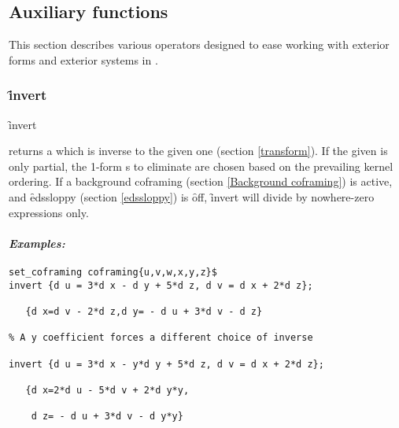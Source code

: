 
\subsection{Auxiliary functions}
\label{Auxiliary functions}

This section describes various operators designed to ease working with
exterior forms and exterior systems in \REDUCE.

\subsubsection{\f{invert}}
\label{invert}

\hypertarget{operator:EDS_INVERT}{}
\begin{syntax}
	\f{invert} 
\end{syntax}
returns a  which is inverse to the given one (section
\ref{transform}). If the  given is only partial, the
1-form s to eliminate are chosen based on the prevailing
kernel ordering. If a background coframing (section \ref{Background
coframing}) is active, and \f{edssloppy} (section \ref{edssloppy}) is
\f{off}, \f{invert} will divide by nowhere-zero expressions only.

\paragraph{\textit{Examples:}}
\begin{verbatim}
set_coframing coframing{u,v,w,x,y,z}$
invert {d u = 3*d x - d y + 5*d z, d v = d x + 2*d z};

   {d x=d v - 2*d z,d y= - d u + 3*d v - d z}

% A y coefficient forces a different choice of inverse

invert {d u = 3*d x - y*d y + 5*d z, d v = d x + 2*d z};

   {d x=2*d u - 5*d v + 2*d y*y,

    d z= - d u + 3*d v - d y*y}
\end{verbatim}


%

